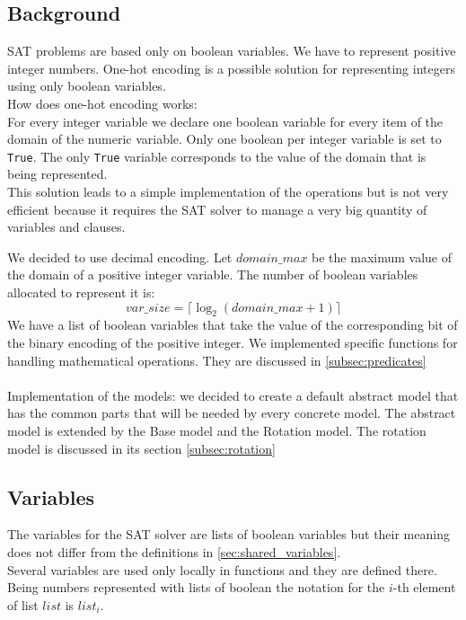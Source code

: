 \subsection{Background}\label{subsec:background}
    
SAT problems are based only on boolean variables. We have to represent positive integer numbers. 
One-hot encoding is a possible solution for representing integers using only boolean variables.\\
How does one-hot encoding works:\\
For every integer variable we declare one boolean variable for every item of the domain of 
the numeric variable. Only one boolean per integer variable is set to \texttt{True}. The only \texttt{True} 
variable corresponds to the value of the domain that is being represented.\\
This solution leads to a simple implementation of the operations but is not very efficient 
because it requires the SAT solver to manage a very big quantity of variables and clauses.

We decided to use decimal encoding. Let $domain\_max$ be the maximum value of the domain of 
a positive integer variable. The number of boolean variables allocated to represent it is:
\begin{equation}
    var\_size = \lceil \log_2 (domain\_max + 1)\rceil
\end{equation}
We have a list of boolean variables that take the value of the corresponding bit of the binary encoding
of the positive integer. We implemented specific functions for handling mathematical operations.
They are discussed in \ref*{subsec:predicates}
\\\\
Implementation of the models:
we decided to create a default abstract model that has the common parts that will be needed by
every concrete model. The abstract model is extended by the Base model and the Rotation model. 
The rotation model is discussed in its section \ref*{subsec:rotation}


\subsection{Variables}\label{subsec:variables}
The variables for the SAT solver are lists of boolean variables but their meaning does not differ from the 
definitions in \ref{sec:shared_variables}.\\
Several variables are used only locally in functions and they are defined there.\\
Being numbers represented with lists of boolean the notation for the $i$-th element of list 
$list$ is $list_i$.

